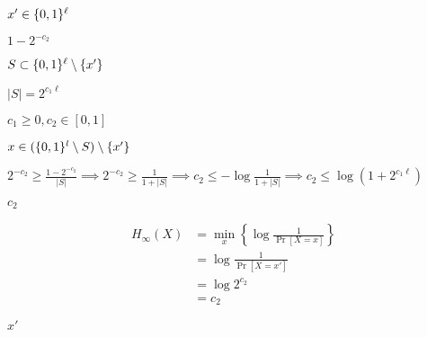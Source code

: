 \documentclass[10pt]{book}
\begin{document}
\begin{mdSnippets}
\begin{mdInlineSnippet}%
$x' \in \{0,1\}^\ell$\end{mdInlineSnippet}%
\begin{mdInlineSnippet}%
$1 - 2^{-c_2}$\end{mdInlineSnippet}%
\begin{mdInlineSnippet}[000c6349bceb1ce0e442f00ba2f4c4ac]%
$S \subset \{0,1\}^\ell \setminus \{x'\}$\end{mdInlineSnippet}%
\begin{mdInlineSnippet}[b9e06a7f6d4241b8c2508687144fe331]%
$|S| = 2^{c_1 \ell}$\end{mdInlineSnippet}%
\begin{mdInlineSnippet}%
$c_1 \geq 0, c_2 \in [0,1]$\end{mdInlineSnippet}%
\begin{mdInlineSnippet}%
$x \in (\{0,1\}^l \setminus S) \setminus \{x'\}$\end{mdInlineSnippet}%
\begin{mdInlineSnippet}[58a665edfa8b8c29dc2d25c3da147886]%
$2^{-c_2} \geq \frac{1-2^{-c_2}}{|S|} \implies2^{-c_2} \geq \frac{1}{1 + |S|} \implies c_2 \leq -\log \frac{1}{1 + |S|} \implies c_2 \leq \log(1 + 2^{c_1 \ell})$\end{mdInlineSnippet}%
\begin{mdInlineSnippet}[71f0427a673c14326195285a092cc63a]%
$c_2$\end{mdInlineSnippet}%
\begin{mdDisplaySnippet}%
\[%
\begin{aligned}
H_{\infty}(X) &= \min_x \left\{\log \frac{1}{\Pr[X = x]} \right\} \\
&= \log \frac{1}{\Pr[X = x']} \\
&= \log 2^{c_2} \\
&= c_2
\end{aligned}
\]%
\end{mdDisplaySnippet}%
\begin{mdInlineSnippet}%
$x'$\end{mdInlineSnippet}%

\end{mdSnippets}
\end{document}

